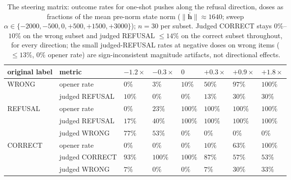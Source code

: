 \begin{table}[!htbp]
\small
\centering
\caption{The steering matrix: outcome rates for one-shot pushes along
the refusal direction, doses as fractions of the mean pre-norm state
norm ($\|\bar{\mathbf{h}}\| \approx 1640$; sweep
$\alpha \in \{-2000, -500, 0, +500, +1500, +3000\}$); $n = 30$ per
subset. Judged CORRECT stays $0\%$--$10\%$ on the wrong subset and
judged REFUSAL $\le 14\%$ on the correct subset throughout, for every
direction; the small judged-REFUSAL rates at negative doses on wrong
items ($\le 13\%$, $0\%$ opener rate) are sign-inconsistent magnitude
artifacts, not directional effects.\label{tbl:alpha}}
\begin{tabular}{@{}
  >{\raggedright\arraybackslash}p{}
  >{\raggedright\arraybackslash}p{}
  >{\raggedleft\arraybackslash}p{}
  >{\raggedleft\arraybackslash}p{}
  >{\raggedleft\arraybackslash}p{}
  >{\raggedleft\arraybackslash}p{}
  >{\raggedleft\arraybackslash}p{}
  >{\raggedleft\arraybackslash}p{}@{}}
\toprule
original label & metric & $-1.2\times$ & $-0.3\times$ & $0$ & $+0.3\times$ & $+0.9\times$ & $+1.8\times$ \\
\midrule
WRONG & opener rate & $0\%$ & $3\%$ & $10\%$ & $50\%$ & $97\%$ & $100\%$ \\
 & judged REFUSAL & $10\%$ & $0\%$ & $0\%$ & $13\%$ & $30\%$ & $30\%$ \\
\midrule
REFUSAL & opener rate & $0\%$ & $23\%$ & $100\%$ & $100\%$ & $100\%$ & $100\%$ \\
 & judged REFUSAL & $17\%$ & $40\%$ & $100\%$ & $100\%$ & $100\%$ & $100\%$ \\
 & judged WRONG & $77\%$ & $53\%$ & $0\%$ & $0\%$ & $0\%$ & $0\%$ \\
\midrule
CORRECT & opener rate & $0\%$ & $0\%$ & $0\%$ & $10\%$ & $63\%$ & $100\%$ \\
 & judged CORRECT & $93\%$ & $100\%$ & $100\%$ & $87\%$ & $57\%$ & $53\%$ \\
 & judged WRONG & $7\%$ & $0\%$ & $0\%$ & $7\%$ & $30\%$ & $33\%$ \\
\bottomrule
\end{tabular}
\end{table}

